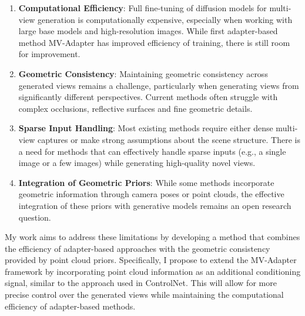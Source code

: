 \begin{enumerate}
    \item \textbf{Computational Efficiency}: Full fine-tuning of diffusion models for multi-view generation is computationally expensive, especially when working with large base models and high-resolution images. While first adapter-based method MV-Adapter has improved efficiency of training, there is still room for improvement.

    \item \textbf{Geometric Consistency}: Maintaining geometric consistency across generated views remains a challenge, particularly when generating views from significantly different perspectives. Current methods often struggle with complex occlusions, reflective surfaces and fine geometric details.

    \item \textbf{Sparse Input Handling}: Most existing methods require either dense multi-view captures or make strong assumptions about the scene structure. There is a need for methods that can effectively handle sparse inputs (e.g., a single image or a few images) while generating high-quality novel views.

    \item \textbf{Integration of Geometric Priors}: While some methods incorporate geometric information through camera poses or point clouds, the effective integration of these priors with generative models remains an open research question.

\end{enumerate}


My work aims to address these limitations by developing a method that combines the efficiency of adapter-based approaches with the geometric consistency provided by point cloud priors. Specifically, I propose to extend the MV-Adapter framework by incorporating point cloud information as an additional conditioning signal, similar to the approach used in ControlNet. This will allow for more precise control over the generated views while maintaining the computational efficiency of adapter-based methods.